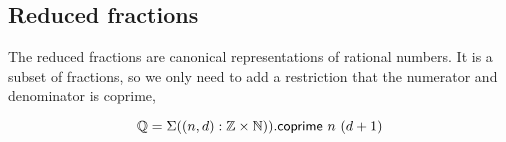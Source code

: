 \begin{code}
\\
\>\AgdaFunction{\_*\_} \AgdaSymbol{:}     \<%
\\
\>\AgdaSymbol{(}\AgdaInductiveConstructor{+} \AgdaSymbol{)} \AgdaFunction{*}  \AgdaSymbol{=} \AgdaInductiveConstructor{+} \AgdaSymbol{(}  \AgdaSymbol{)}\<%
\\
\>\AgdaSymbol{(} \AgdaSymbol{)} \AgdaFunction{*}  \AgdaSymbol{=} \AgdaInductiveConstructor{+} \<%
\\
\>\AgdaSymbol{(} \AgdaSymbol{)} \AgdaFunction{*}   \AgdaSymbol{=}  \AgdaSymbol{(}     \AgdaSymbol{)}\<%
\\
%
\\
\> \<[35]%
\>[35]\AgdaSymbol{:}   \AgdaSymbol{\_}\<%
\\
\>\AgdaSymbol{(}  \AgdaSymbol{)}  \AgdaSymbol{(}  \AgdaSymbol{)} \AgdaSymbol{=} \<[31]%
\>[31] \AgdaFunction{*}     \AgdaFunction{*}  \<%
\\
\end{code}


\subsection{Reduced fractions}

The reduced fractions are canonical representations of rational
numbers. It is a subset of fractions, so we only need to add a
restriction that the numerator and denominator is coprime,


$$\mathbb{Q} = \Sigma ((n , d) : \mathbb{Z} \times \mathbb{N})). \mathsf{coprime} ~n ~(d +1)$$

